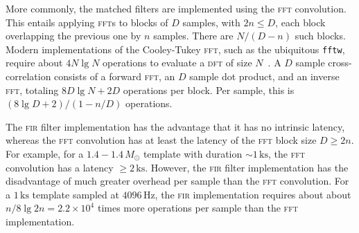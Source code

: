 More commonly, the matched filters are implemented using the \textsc{fft} convolution.  This entails applying \textsc{fft}s to blocks of $D$ samples, with $2 n \leq D$, each block overlapping the previous one by $n$ samples.  There are $N/(D-n)$ such blocks.  Modern implementations of the Cooley-Tukey \textsc{fft}, such as the ubiquitous \texttt{fftw}, require about $4 N \lg N$ operations to evaluate a \textsc{dft} of size $N$~\cite{Johnson:2007p9654}.    A $D$ sample cross-correlation consists of a forward \textsc{fft}, an $D$ sample dot product, and an inverse \textsc{fft}, totaling $8 D \lg N + 2 D$ operations per block.  Per sample, this is $(8 \lg D + 2) / (1 - n/D)$ operations. 

The \textsc{fir} filter implementation has the advantage that it has no intrinsic latency, whereas the \textsc{fft} convolution has at least the latency of the \textsc{fft} block size $D \geq 2 n$.   For example, for a $1.4 - 1.4 \, M_\odot$ template with duration $\sim 1 \, \mathrm{ks}$, the \textsc{fft} convolution has a latency $\geq 2 \, \mathrm{ks}$.  However, the \textsc{fir} filter implementation has the disadvantage of much greater overhead per sample than the \textsc{fft} convolution.  For a $1\,\mathrm{ks}$ template sampled at $4096\,\mathrm{Hz}$, the \textsc{fir} implementation requires about about $n / 8 \lg 2 n = 2.2 \times 10^4$ times more operations per sample than the \textsc{fft} implementation.



